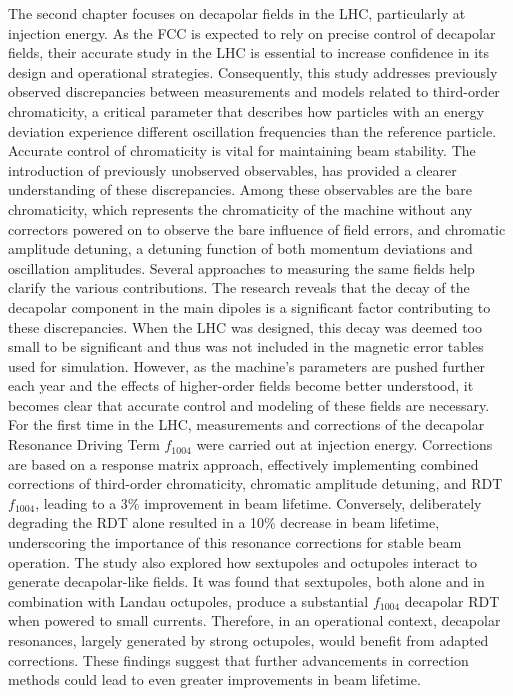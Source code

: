 {%
The second chapter focuses on decapolar fields in the LHC, particularly at injection energy. As the
FCC is expected to rely on precise control of decapolar fields, their accurate study in the LHC is
essential to increase confidence in its design and operational strategies.  Consequently, this study
addresses previously observed discrepancies between measurements and models related to third-order
chromaticity, a critical parameter that describes how particles with an energy deviation experience
different oscillation frequencies than the reference particle. Accurate control of chromaticity is
vital for maintaining beam stability. The introduction of previously unobserved observables, has
provided a clearer understanding of these discrepancies.  Among these observables are the bare
chromaticity, which represents the chromaticity of the machine without any correctors powered on to
observe the bare influence of field errors, and chromatic amplitude detuning, a detuning function of
both momentum deviations and oscillation amplitudes. Several approaches to measuring the same fields
help clarify the various contributions. The research reveals that the decay of the decapolar
component in the main dipoles is a significant factor contributing to these discrepancies. When the
LHC was designed, this decay was deemed too small to be significant and thus was not included in the
magnetic error tables used for simulation. However, as the machine's parameters are pushed further
each year and the effects of higher-order fields become better understood, it becomes clear that
accurate control and modeling of these fields are necessary.
\\
\indent
For the first time in the LHC, measurements and corrections of the decapolar Resonance Driving Term
$f_{1004}$ were carried out at injection energy. Corrections are based on a response matrix
approach, effectively implementing combined corrections of third-order chromaticity, chromatic
amplitude detuning, and RDT $f_{1004}$, leading to a 3\% improvement in beam lifetime.  Conversely,
deliberately degrading the RDT alone resulted in a 10\% decrease in beam lifetime, underscoring the
importance of this resonance corrections for stable beam operation. The study also explored how
sextupoles and octupoles interact to generate decapolar-like fields. It was found that sextupoles,
both alone and in combination with Landau octupoles, produce a substantial $f_{1004}$ decapolar RDT
when powered to small currents. Therefore, in an operational context, decapolar resonances, largely
generated by strong octupoles, would benefit from adapted corrections. These findings suggest that
further advancements in correction methods could lead to even greater improvements in beam
lifetime.

}
